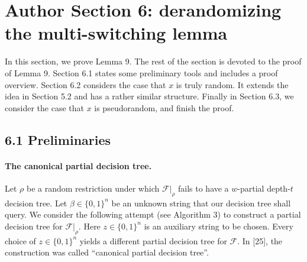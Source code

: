 \section*{Author Section 6: derandomizing the multi-switching lemma}
In this section, we prove Lemma 9. The rest of the section is devoted to the proof of Lemma 9. Section 6.1 states some preliminary tools and includes a proof overview. Section 6.2 considers the case that $x$ is truly random. It extends the idea in Section 5.2 and has a rather similar structure. Finally in Section 6.3, we consider the case that $x$ is pseudorandom, and finish the proof.
\subsection*{6.1 Preliminaries}
\paragraph{The canonical partial decision tree.} Let $\rho$ be a random restriction under which $\mathcal F|_\rho$ fails to have a $w$-partial depth-$t$ decision tree. Let $\beta\in\{0,1\}^n$ be an unknown string that our decision tree shall query. We consider the following attempt (see Algorithm 3) to construct a partial decision tree for $\mathcal F|_\rho$. Here $z\in\{0,1\}^n$ is an auxiliary string to be chosen. Every choice of $z\in\{0,1\}^n$ yields a different partial decision tree for $\mathcal F$. In [25], the construction was called ``canonical partial decision tree''.
